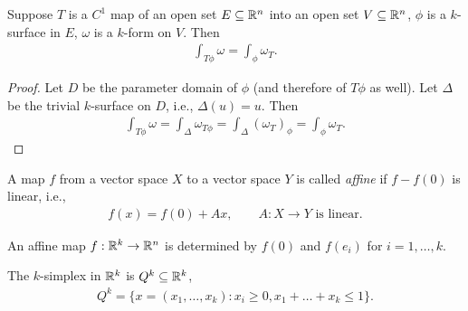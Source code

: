 \documentclass[11pt]{article}
\begin{document}
\begin{theorem} Suppose $T$ is a $C^1$ map of an open set $E \subseteq \mathbb{R}^n$ into an open set $V \subseteq \mathbb{R}^n$, $\phi$ is a $k$-surface in $E$, $\omega$ is a $k$-form on $V$. Then \begin{align*} \int_{T \phi} \omega = \int_{\phi} \omega_T.
\end{align*}
\end{theorem}
\begin{proof} Let $D$ be the parameter domain of $\phi$ (and therefore of $T \phi$ as well). Let $\Delta$ be the trivial $k$-surface on $D$, i.e., $\Delta (u) = u$. Then \begin{align*} \int_{T \phi} \omega = \int_{\Delta} \omega_{T \phi} = \int_{\Delta} (\omega_T)_{\phi} = \int_{\phi} \omega_T.
\end{align*}
\end{proof}

\begin{definition} A map $f$ from a vector space $X$ to a vector space $Y$ is called \emph{affine} if $f - f(0)$ is linear, i.e., \begin{align*} f(x) = f(0) + Ax, \qquad A: X \to Y \text{ is linear}.
\end{align*}
\end{definition}

\begin{remark} An affine map $f: \mathbb{R}^k \to \mathbb{R}^n$ is determined by $f(0)$ and $f(e_i)$ for $i = 1, \dots, k$.
\end{remark}

\begin{definition} The $k$-simplex in $\mathbb{R}^k$ is $Q^k \subseteq \mathbb{R}^k$, \begin{align*} Q^k = \{ x = (x_1, \dots, x_k) : x_i \ge 0, x_1 + \dots + x_k \le 1 \}.
\end{align*}
\end{definition}
\end{document}
